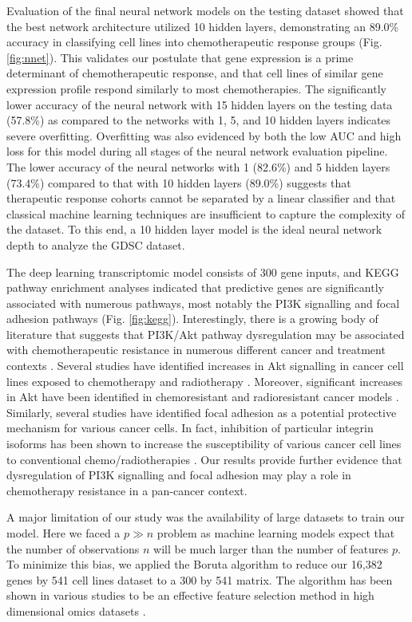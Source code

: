 \documentclass[10pt, letterpaper, twocolumn]{article}
\begin{document}
Evaluation of the final neural network models on the testing dataset showed that the best network architecture utilized 10 hidden layers, demonstrating an 89.0\% accuracy in classifying cell lines into chemotherapeutic response groups (Fig. \ref{fig:nnet}). This validates our postulate that gene expression is a prime determinant of chemotherapeutic response, and that cell lines of similar gene expression profile respond similarly to most chemotherapies. The significantly lower accuracy of the neural network with 15 hidden layers on the testing data (57.8\%) as compared to the networks with 1, 5, and 10 hidden layers indicates severe overfitting. Overfitting was also evidenced by both the low AUC and high loss for this model during all stages of the neural network evaluation pipeline. The lower accuracy of the neural networks with 1 (82.6\%) and 5 hidden layers (73.4\%) compared to that with 10 hidden layers (89.0\%) suggests that therapeutic response cohorts cannot be separated by a linear classifier and that classical machine learning techniques are insufficient to capture the complexity of the dataset. To this end, a 10 hidden layer model is the ideal neural network depth to analyze the GDSC dataset.

The deep learning transcriptomic model consists of 300 gene inputs, and KEGG pathway enrichment analyses indicated that predictive genes are significantly associated with numerous pathways, most notably the PI3K signalling and focal adhesion pathways (Fig. \ref{fig:kegg}). Interestingly, there is a growing body of literature that suggests that PI3K/Akt pathway dysregulation may be associated with chemotherapeutic resistance in numerous different cancer and treatment contexts \cite{huang_2009}. Several studies have identified increases in Akt signalling in cancer cell lines exposed to chemotherapy and radiotherapy \cite{mapk, wort, phos}. Moreover, significant increases in Akt have been identified in chemoresistant and radioresistant cancer models \cite{cholangio}. Similarly, several studies have identified focal adhesion as a potential protective mechanism for various cancer cells. In fact, inhibition of particular integrin isoforms has been shown to increase the susceptibility of various cancer cell lines to conventional chemo/radiotherapies \cite{focal_adhesion}. Our results provide further evidence that dysregulation of PI3K signalling and focal adhesion may play a role in chemotherapy resistance in a pan-cancer context.

A major limitation of our study was the availability of large datasets to train our model. Here we faced a $p \gg n$ problem as machine learning models expect that the number of observations $n$ will be much larger than the number of features $p$. To minimize this bias, we applied the Boruta algorithm to reduce our 16,382 genes by 541 cell lines dataset to a 300 by 541 matrix. The algorithm has been shown in various studies to be an effective feature selection method in high dimensional omics datasets \cite{boruta}.
\end{document}
